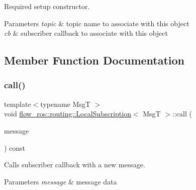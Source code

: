 Required setup constructor. 


\begin{DoxyParams}{Parameters}
{\em topic} & topic name to associate with this object \\
\hline
{\em cb} & subscriber callback to associate with this object \\
\hline
\end{DoxyParams}


\subsection{Member Function Documentation}
\mbox{\label{classflow__ros_1_1routing_1_1_local_subscription_add75c608907362a9e7f808fd15c3ff06}} 
\subsubsection{\texorpdfstring{call()}{call()}}
{\footnotesize\ttfamily template$<$typename MsgT $>$ \\
void \hyperlink{classflow__ros_1_1routing_1_1_local_subscription}{flow\+\_\+ros\+::routing\+::\+Local\+Subscription}$<$ MsgT $>$\+::call (\begin{DoxyParamCaption}\item[{const \hyperlink{namespaceflow__ros_ad222b6c2bd0341c551129c3a03241ad7}{message\+\_\+shared\+\_\+const\+\_\+ptr\+\_\+t}$<$ MsgT $>$ \&}]{message }\end{DoxyParamCaption}) const\hspace{0.3cm}{\ttfamily [inline]}}



Calls subscriber callback with a new message. 


\begin{DoxyParams}{Parameters}
{\em message} & message data \\
\hline
\end{DoxyParams}
\mbox{\label{classflow__ros_1_1routing_1_1_local_subscription_a748216bf715060b2435f8e051d547c84}} 
